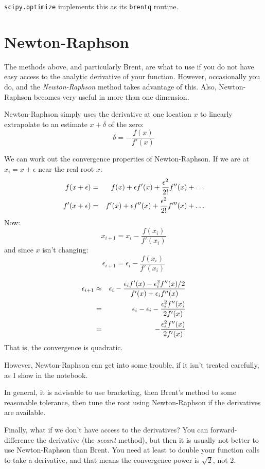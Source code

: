 {\tt scipy.optimize} implements this as its {\tt brentq} routine.

\section{Newton-Raphson}

The methods above, and particularly Brent, are what to use if you
do not have easy access to the analytic derivative of your function. 
However, occasionally you do, and the {\it Newton-Raphson} method
takes advantage of this. Also, Newton-Raphson becomes very useful in
more than one dimension.

Newton-Raphson simply uses the derivative at one location $x$ to linearly
extrapolate to an estimate $x+\delta$ of the zero:
\begin{equation}
\delta = - \frac{f(x)}{f'(x)}
\end{equation}

We can work out the convergence properties of Newton-Raphson. If we
are at $x_i = x+\epsilon$ near the real root $x$:
\begin{eqnarray}
f(x+\epsilon) &=& f(x) + \epsilon f'(x) + \frac{\epsilon^2}{2!} f''(x) +
\ldots \cr
f'(x+\epsilon) &=& f'(x) + \epsilon f''(x) + \frac{\epsilon^2}{2!}
f'''(x) + \ldots \cr
\end{eqnarray}
Now:
\begin{equation}
x_{i+1} = x_i - \frac{f(x_i)}{f'(x_i)}
\end{equation}
and since $x$ isn't changing:
\begin{equation}
\epsilon_{i+1} = \epsilon_i - \frac{f(x_i)}{f'(x_i)}
\end{equation}


\begin{answer}
\begin{eqnarray}
  \epsilon_{i+1} &\approx&
  \epsilon_i - \frac{\epsilon_i f'(x) - \epsilon_i^2
  f''(x) /2}{f'(x) + \epsilon_i f''(x)} \cr
  &=& \epsilon_i - \epsilon_i - \frac{\epsilon_i^2 f''(x)}{2 f'(x)} \cr
  &=& - \frac{\epsilon_i^2 f''(x)}{2 f'(x)}
\end{eqnarray}
That is, the convergence is quadratic.
\end{answer}

However, Newton-Raphson can get into some trouble, if it isn't treated
carefully, as I show in the notebook.

In general, it is advisable to use bracketing, then Brent's method to
some reasonable tolerance, then tune the root using Newton-Raphson if
the derivatives are available.

Finally, what if we don't have access to the derivatives? You can
forward-difference the derivative (the {\it secant} method), but then
it is usually not better to use Newton-Raphson than Brent. You need at
least to double your function calls to take a derivative, and that
means the convergence power is $\sqrt{2}$, not 2.
